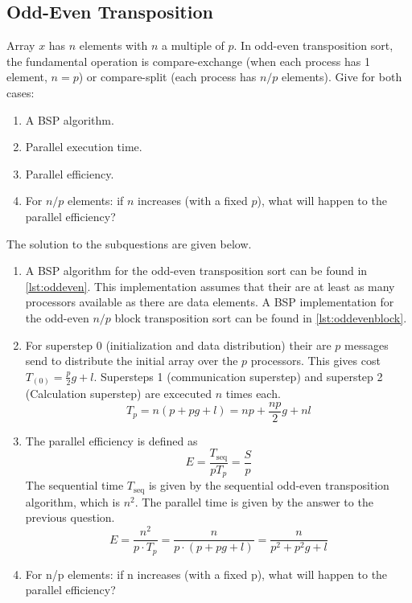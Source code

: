 \documentclass[../main.tex]{subfiles}
\begin{document}
\subsection{Odd-Even Transposition}
\begin{question}
Array $x$ has $n$ elements with $n$ a multiple of $p$. In odd-even transposition sort, the fundamental operation is compare-exchange (when each process has 1 element, $n = p$) or compare-split (each process has $n/p$ elements). Give for both cases:
\begin{enumerate}
	\item A BSP algorithm.
	\item Parallel execution time.
	\item Parallel efficiency.
	\item For $n/p$ elements: if $n$ increases (with a fixed $p$), what will happen to the parallel efficiency?
\end{enumerate}

\end{question}
\begin{solution} The solution to the subquestions are given below.
\begin{enumerate}
	\item A BSP algorithm for the odd-even transposition sort can be found in \autoref{lst:oddeven}. This implementation assumes that their are at least as many processors available as there are data elements. A BSP implementation for the odd-even $n/p$ block transposition sort can be found in \autoref{lst:oddevenblock}.
		
		
	\item For superstep 0 (initialization and data distribution) their are $p$ messages send to distribute the initial array over the $p$ processors. This gives cost $T_{(0)} = \frac{p}{2}g + l$. Supersteps 1 (communication superstep) and superstep 2 (Calculation superstep) are excecuted $n$ times each.
	\begin{equation}
		T_p = n(p + pg + l) = np + \frac{np}{2}g + nl
	\end{equation}
	\item The parallel efficiency is defined as
	\begin{equation}
		E = \frac{T_\text{seq}}{p T_p} = \frac{S}{p}
	\end{equation}
	The sequential time $T_\text{seq}$ is given by the sequential odd-even transposition algorithm, which is $n^2$. The parallel time is given by the answer to the previous question.
	\begin{equation}
		E = \frac{n^2}{p \cdot T_p} = \frac{n}{p \cdot (p + pg + l)} = \frac{n}{p^2 + p^2g + l}
	\end{equation}
	\item For n/p elements: if n increases (with a fixed p), what will happen to the parallel efficiency?
\end{enumerate}
\end{solution}
\end{document}
